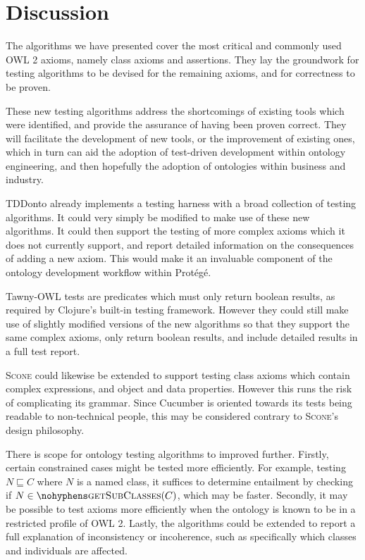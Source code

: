 \documentclass[paper.tex]{subfiles}
\begin{document}
\section{Discussion}
\label{sec:discussion}

The algorithms we have presented cover the most critical and commonly used OWL 2 axioms, namely class axioms and assertions. 
They lay the groundwork for testing algorithms to be devised for the remaining axioms, and for correctness to be proven.

These new testing algorithms address the shortcomings of existing tools which were identified, and provide the assurance of having been proven correct.
They will facilitate the development of new tools, or the improvement of existing ones, which in turn can aid the adoption of test-driven development within ontology engineering, and then hopefully the adoption of ontologies within business and industry.

TDDonto already implements a testing harness with a broad collection of testing algorithms.
It could very simply be modified to make use of these new algorithms.
It could then support the testing of more complex axioms which it does not currently support, and report detailed information on the consequences of adding a new axiom.
This would make it an invaluable component of the ontology development workflow within Prot\'eg\'e.

Tawny-OWL tests are predicates which must only return boolean results, as required by Clojure's built-in testing framework.
However they could still make use of slightly modified versions of the new algorithms so that they support the same complex axioms, only return boolean results, and include detailed results in a full test report.

\textsc{Scone} could likewise be extended to support testing class axioms which contain complex expressions, and object and data properties.
However this runs the risk of complicating its grammar.
Since Cucumber is oriented towards its tests being readable to non-technical people, this may be considered contrary to \textsc{Scone}'s design philosophy.

There is scope for ontology testing algorithms to improved further.
Firstly, certain constrained cases might be tested more efficiently.
For example, testing $N \sqsubseteq C$ where $N$ is a named class, it suffices to determine entailment by checking if $N \in \textproc{getSubClasses}(C)$, which may be faster.
Secondly, it may be possible to test axioms more efficiently when the ontology is known to be in a restricted profile of OWL 2.
Lastly, the algorithms could be extended to report a full explanation of inconsistency or incoherence, such as specifically which classes and individuals are affected.
\end{document}
